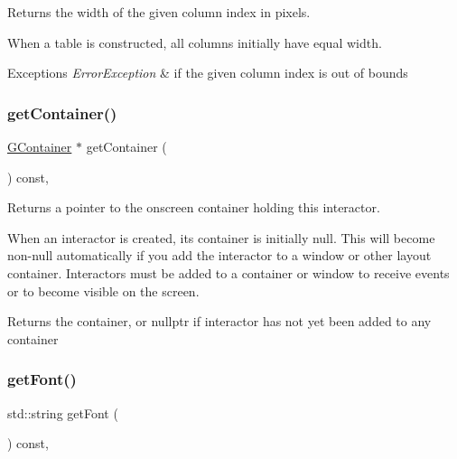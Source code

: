 Returns the width of the given column index in pixels. 

When a table is constructed, all columns initially have equal width. 
\begin{DoxyExceptions}{Exceptions}
{\em Error\+Exception} & if the given column index is out of bounds \\
\hline
\end{DoxyExceptions}
\mbox{\label{classsgl_1_1GInteractor_a7a6e317c29d61030929b4cd2d1c00fe7}} 
\subsubsection{\texorpdfstring{get\+Container()}{getContainer()}}
{\footnotesize\ttfamily \mbox{\hyperlink{classsgl_1_1GContainer}{G\+Container}} $\ast$ get\+Container (\begin{DoxyParamCaption}{ }\end{DoxyParamCaption}) const\hspace{0.3cm}{\ttfamily [virtual]}, {\ttfamily [inherited]}}



Returns a pointer to the onscreen container holding this interactor. 

When an interactor is created, its container is initially null. This will become non-\/null automatically if you add the interactor to a window or other layout container. Interactors must be added to a container or window to receive events or to become visible on the screen. \begin{DoxyReturn}{Returns}
the container, or nullptr if interactor has not yet been added to any container 
\end{DoxyReturn}
\mbox{\label{classsgl_1_1GInteractor_a894a5502900794eeb27d084c21f1d77d}} 
\subsubsection{\texorpdfstring{get\+Font()}{getFont()}}
{\footnotesize\ttfamily std\+::string get\+Font (\begin{DoxyParamCaption}{ }\end{DoxyParamCaption}) const\hspace{0.3cm}{\ttfamily [virtual]}, {\ttfamily [inherited]}}



